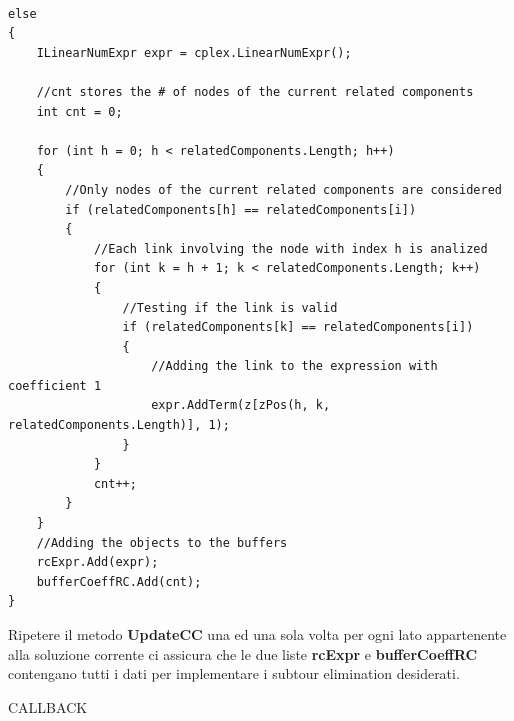 \documentclass[11pt]{article}
\begin{document}
\begin{lstlisting}

else
{
    ILinearNumExpr expr = cplex.LinearNumExpr();

    //cnt stores the # of nodes of the current related components
    int cnt = 0;

    for (int h = 0; h < relatedComponents.Length; h++)
    {
        //Only nodes of the current related components are considered
        if (relatedComponents[h] == relatedComponents[i])
        {
            //Each link involving the node with index h is analized
            for (int k = h + 1; k < relatedComponents.Length; k++)
            {
                //Testing if the link is valid
                if (relatedComponents[k] == relatedComponents[i])
                {
                    //Adding the link to the expression with coefficient 1
                    expr.AddTerm(z[zPos(h, k, relatedComponents.Length)], 1);
                }
            }
            cnt++;
        }
    }
    //Adding the objects to the buffers
    rcExpr.Add(expr);
    bufferCoeffRC.Add(cnt);
}

\end{lstlisting}

Ripetere il metodo \textbf{UpdateCC} una ed una sola volta per ogni lato appartenente alla soluzione corrente ci assicura che le due liste \textbf{rcExpr} e \textbf{bufferCoeffRC} contengano tutti i dati per implementare i subtour elimination desiderati.

\vspace{2\baselineskip}
CALLBACK
\vspace{2\baselineskip}
\end{document}
